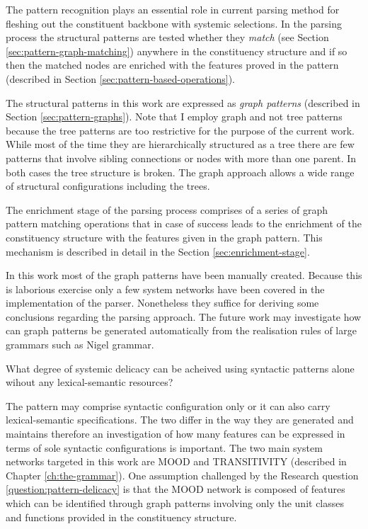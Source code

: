The pattern recognition plays an essential role in current parsing method for fleshing out the constituent backbone with systemic selections. In the parsing process the structural patterns are tested whether they \textit{match} (see Section \ref{sec:pattern-graph-matching}) anywhere in the constituency structure and if so then the matched nodes are enriched with the features proved in the pattern (described in Section \ref{sec:pattern-based-operations}). 

The structural patterns in this work are expressed as \textit{graph patterns} (described in Section \ref{sec:pattern-graphs}). Note that I employ graph and not tree patterns because the tree patterns are too restrictive for the purpose of the current work. While most of the time they are hierarchically structured as a tree there are few patterns that involve sibling connections or nodes with more than one parent. In both cases the tree structure is broken. The graph approach allows a wide range of structural configurations including the trees. 

The enrichment stage of the parsing process comprises of a series of graph pattern matching operations that in case of success leads to the enrichment of the constituency structure with the features given in the graph pattern. This mechanism is described in detail in the Section \ref{sec:enrichment-stage}. 

In this work most of the graph patterns have been manually created. Because this is laborious exercise only a few system networks have been covered in the implementation of the parser. Nonetheless they suffice for deriving some conclusions regarding the parsing approach. The future work may investigate how can graph patterns be generated automatically from the realisation rules of large grammars such as Nigel grammar. 

\begin{question}\label{question:pattern-delicacy}
    What degree of systemic delicacy can be acheived using syntactic patterns alone wihout any lexical-semantic resources?
\end{question}

The pattern may comprise syntactic configuration only or it can also carry lexical-semantic specifications. The two differ in the way they are generated and maintains therefore an investigation of how many features can be expressed in terms of sole syntactic configurations is important. The two main system networks targeted in this work are MOOD and TRANSITIVITY (described in Chapter \ref{ch:the-grammar}). One assumption challenged by the Research question \ref{question:pattern-delicacy} is that the MOOD network is composed of features which can be identified through graph patterns involving only the unit classes and functions provided in the constituency structure. 

